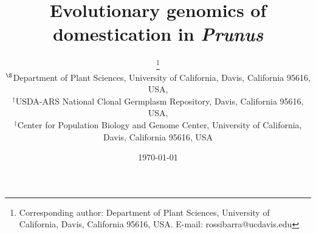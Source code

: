 \documentclass[12pt]{article}
\begin{document}
\title{Evolutionary genomics of domestication in \emph{Prunus}}

\author{\small{}\thanks{Corresponding author: Department of Plant Sciences, University of California, Davis, California 95616, USA. E-mail: \mbox{rossibarra@ucdavis.edu}} \\[0.3cm]
     \small\sf $^{\S}$Department of Plant Sciences, University of California, Davis, California 95616, USA,\\
     \small\sf $^{\dag}$USDA-ARS National Clonal Germplasm Repository, Davis, California 95616, USA,\\
     \small\sf $^{\ddag}$Center for Population Biology and Genome Center, University of California, Davis, California 95616, USA}

\date{\today}

\maketitle
\end{document}
